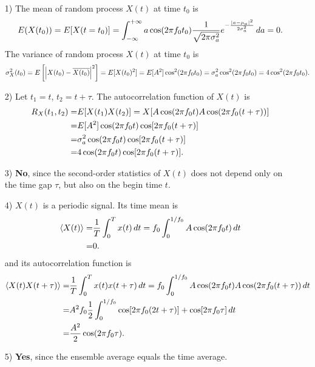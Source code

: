 \documentclass{assignment}
\begin{document}
\begin{sol}
    \begin{itemize}
        \item[1)] The mean of random process $X(t)$ at time $t_0$ is
        \begin{align}
            E(X(t_0))=E[X(t=t_0)]=\int_{-\infty}^{+\infty}a\cos(2\pi f_0t_0)\frac{1}{\sqrt{2\pi\sigma_a^2}}e^{-\frac{\left\lvert a-\mu_a\right\rvert^2}{2\sigma_a^2}}\,da=0.
        \end{align}
        The variance of random process $X(t)$ at time $t_0$ is
        \begin{align}
            \sigma_X^2(t_0)=E\left[\left\lvert X(t_0)-\overline{X(t_0)}\right\rvert^2\right]=E[X(t_0)^2]=E[A^2]\cos^2(2\pi f_0t_0)=\sigma_a^2\cos^2(2\pi f_0t_0)=4\cos^2(2\pi f_0t_0).
        \end{align}
        \item[2)] Let $t_1=t$, $t_2=t+\tau$. The autocorrelation function of $X(t)$ is
        \begin{align}
            \notag R_X(t_1,t_2)=&E[X(t_1)X(t_2)]=X[A\cos(2\pi f_0t)A\cos(2\pi f_0(t+\tau))]\\
            \notag=&E[A^2]\cos(2\pi f_0t)\cos[2\pi f_0(t+\tau)]\\
            \notag=&\sigma_a^2\cos(2\pi f_0t)\cos[2\pi f_0(t+\tau)]\\
            =&4\cos(2\pi f_0t)\cos[2\pi f_0(t+\tau)].
        \end{align}
        \item[3)] \textbf{No}, since the second-order statistics of $X(t)$ does not depend only on the time gap $\tau$, but also on the begin time $t$.
        \item[4)] $X(t)$ is a periodic signal. Its time mean is
        \begin{align}
            \notag\langle X(t)\rangle=&\frac{1}{T}\int_0^Tx(t)\,dt=f_0\int_0^{1/f_0}A\cos(2\pi f_0t)\,dt\\
            =&0.
        \end{align}
        and its autocorrelation function is
        \begin{align}
            \notag\langle X(t)X(t+\tau)\rangle=&\frac{1}{T}\int_0^Tx(t)x(t+\tau)\,dt=f_0\int_0^{1/f_0}A\cos(2\pi f_0t)A\cos(2\pi f_0(t+\tau))\,dt\\
            \notag=&A^2f_0\frac{1}{2}\int_0^{1/f_0}\cos[2\pi f_0(2t+\tau)]+\cos[2\pi f_0\tau]\,dt\\
            =&\frac{A^2}{2}\cos(2\pi f_0\tau).
        \end{align}
        \item[5)] \textbf{Yes}, since the ensemble average equals the time average.
    \end{itemize}
\end{sol}
\end{document}
